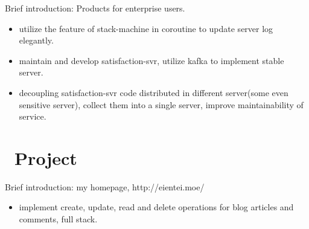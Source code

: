 \documentclass{resume}
\begin{document}
Brief introduction: Products for enterprise users. 
\begin{itemize}
  \item utilize the feature of stack-machine in coroutine to update server log elegantly.
  \item maintain and develop satisfaction-svr, utilize kafka to implement stable server. 
  \item decoupling satisfaction-svr code distributed in different server(some even sensitive server), collect them into a single server, improve maintainability of service.
\end{itemize}

\section{\faCode\ Project}
Brief introduction: my homepage, http://eientei.moe/
\begin{itemize}
  \item implement create, update, read and delete operations for blog articles and comments, full stack.
\end{itemize}
\end{document}
